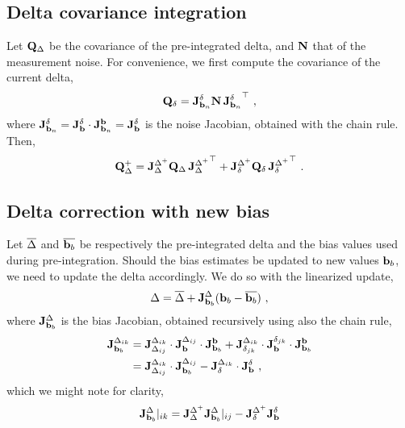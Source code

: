 \subsection{Delta covariance integration}

Let ${\bf Q}_\Delta$ be the covariance of the pre-integrated delta, and ${\bf N}$ that of the measurement noise. For convenience, we first compute the covariance of the current delta,
%
\begin{align}
{\bf Q}_\delta =  {{\bf J}^{\delta}_{{\bf b}_n}}{\bf N}\,{{\bf J}^{\delta}_{{\bf b}_n}}^{\top}
~,
\end{align}
%
where ${{\bf J}^{\delta}_{{\bf b}_n}} = {{\bf J}^{\delta}_{{\bf b}}} \cdot {{\bf J}^{{\bf b}}_{{\bf b}_n}} = {{\bf J}^{\delta}_{{\bf b}}}$ is the noise Jacobian, obtained with the chain rule.
%
Then,
%
\begin{align}
{\bf Q}_\Delta^+ = {{\bf J}^{\Delta^+}_{\Delta}}{\bf Q}_\Delta\,{{\bf J}^{\Delta^+}_{\Delta}}^{\top} + {{\bf J}^{\Delta^+}_{\delta}}{\bf Q}_\delta\,{{\bf J}^{\Delta^+}_{\delta}}^{\top}
~.
\end{align}




\subsection{Delta correction with new bias}

Let $\overline{\Delta}$ and $\overline{{\bf b}_b}$ be respectively the pre-integrated delta and the bias values used during pre-integration. Should the bias estimates be updated to new values ${\bf b}_b$, we need to update the delta accordingly. We do so with the linearized update,
%
\begin{align}\label{equ:delta_correction}
\Delta = \overline{\Delta} + {{\bf J}^{\Delta}_{{\bf b}_b}}({\bf b}_b - \overline{{\bf b}_b})
~,
\end{align}
%
where ${{\bf J}^{\Delta}_{{\bf b}_b}}$ is the bias Jacobian, obtained recursively using also the chain rule,
%
\begin{align*}
{{\bf J}^{\Delta_{ik}}_{{\bf b}_b}} 
&= 
{{\bf J}^{\Delta_{ik}}_{\Delta_{ij}}} \cdot {{\bf J}^{\Delta_{ij}}_{{\bf b}}} \cdot {{\bf J}^{{\bf b}}_{{\bf b}_b}} 
+ 
{{\bf J}^{\Delta_{ik}}_{\delta_{jk}}} \cdot {{\bf J}^{\delta_{jk}}_{{\bf b}}} \cdot {{\bf J}^{{\bf b}}_{{\bf b}_b}} \\
&= {{\bf J}^{\Delta_{ik}}_{\Delta_{ij}}} \cdot {{\bf J}^{\Delta_{ij}}_{{\bf b}_b}} - {{\bf J}^{\Delta_{ik}}_{\delta}} \cdot {{\bf J}^{\delta}_{{\bf b}}}
~,
\end{align*}
%
which we might note for clarity,
%
\begin{align}
{{\bf J}^{\Delta}_{{\bf b}_b}}|_{ik} = {{\bf J}^{\Delta^+}_{\Delta}}{{\bf J}^{\Delta}_{{\bf b}_b}}|_{ij} - {{\bf J}^{\Delta^+}_{\delta}}{{\bf J}^{\delta}_{{\bf b}}}
\end{align}


